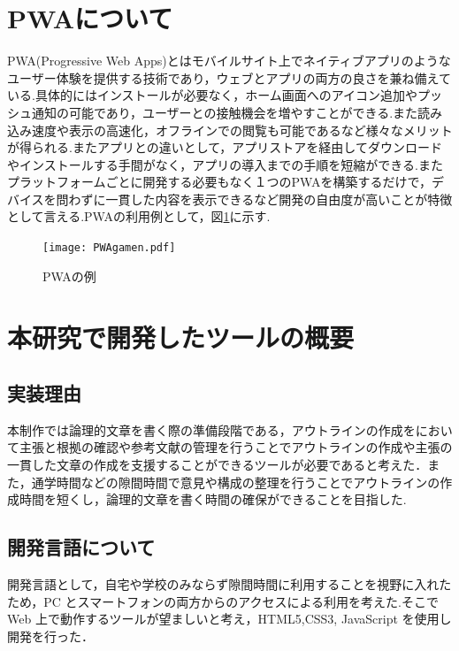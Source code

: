 \documentclass[a4j,12pt]{jarticle}
\begin{document}
\newpage
\section{PWAについて}

PWA(Progressive Web Apps)とはモバイルサイト上でネイティブアプリのようなユーザー体験を提供する技術であり，ウェブとアプリの両方の良さを兼ね備えている.具体的にはインストールが必要なく，ホーム画面へのアイコン追加やプッシュ通知の可能であり，ユーザーとの接触機会を増やすことができる.また読み込み速度や表示の高速化，オフラインでの閲覧も可能であるなど様々なメリットが得られる.またアプリとの違いとして，アプリストアを経由してダウンロードやインストールする手間がなく，アプリの導入までの手順を短縮ができる.またプラットフォームごとに開発する必要もなく１つのPWAを構築するだけで，デバイスを問わずに一貫した内容を表示できるなど開発の自由度が高いことが特徴として言える\cite{ren6}.PWAの利用例として，図\ref{fig:f}に示す.
\begin{figure}[h]
\begin{center}
 \texttt{[image: PWAgamen.pdf]}
\end{center}
 \caption{PWAの例}
 \label{fig:f}
\end{figure}
\newpage

\section{本研究で開発したツールの概要}
\subsection{実装理由}
本制作では論理的文章を書く際の準備段階である，アウトラインの作成をにおいて主張と根拠の確認や参考文献の管理を行うことでアウトラインの作成や主張の一貫した文章の作成を支援することができるツールが必要であると考えた．また，通学時間などの隙間時間で意見や構成の整理を行うことでアウトラインの作成時間を短くし，論理的文章を書く時間の確保ができることを目指した.

\subsection{開発言語について}
開発言語として，自宅や学校のみならず隙間時間に利用することを視野に入れたため，PC とスマートフォンの両方からのアクセスによる利用を考えた.そこで Web 上で動作するツールが望ましいと考え，HTML5,CSS3, JavaScript を使用し開発を行った．
\end{document}
